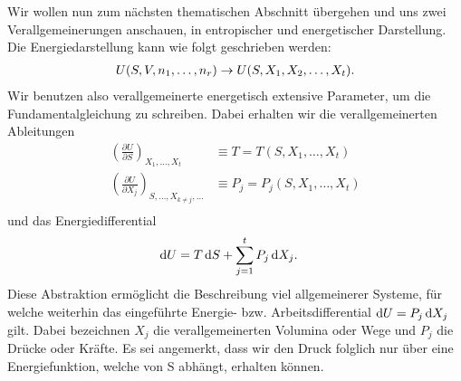 Wir wollen nun zum nächsten thematischen Abschnitt übergehen und uns zwei Verallgemeinerungen anschauen, in entropischer und energetischer Darstellung.
Die Energiedarstellung kann wie folgt geschrieben werden:
\begin{align*}
    U(S,V,n_1,\ldots,n_r) \rightarrow U(S,X_1,X_2,\ldots,X_t).
\end{align*}
Wir benutzen also verallgemeinerte energetisch extensive Parameter, um die Fundamentalgleichung zu schreiben. Dabei erhalten wir die verallgemeinerten Ableitungen 
\begin{align*}
    \left(\frac{\partial U}{\partial S}\right)_{X_1,\ldots,X_t}                & \equiv T = T(S,X_1,\ldots,X_t)             \\
    \left(\frac{\partial U}{\partial X_j}\right)_{S,\ldots,X_{k\neq j},\ldots} & \equiv P_j = P_j(S,X_1,\ldots,X_t)         \\
\end{align*}
und das Energiedifferential
\begin{align}
    \label{eq:energetische_fundamentalgleichung}
    \mathop{}\!\mathrm{d} U  & = T\mathop{}\!\mathrm{d} S + \sum_{j=1}^tP_j\mathop{}\!\mathrm{d} X_j.
\end{align}
Diese Abstraktion ermöglicht die Beschreibung viel allgemeinerer Systeme, für welche weiterhin das eingeführte Energie- bzw. Arbeitsdifferential $\mathop{}\!\mathrm{d} U = P_j\mathop{}\!\mathrm{d} X_j$ gilt.
Dabei bezeichnen $X_j$ die verallgemeinerten Volumina oder Wege und $P_j$ die Drücke oder Kräfte.
Es sei angemerkt, dass wir den Druck folglich nur über eine Energiefunktion, welche von S abhängt, erhalten können.

